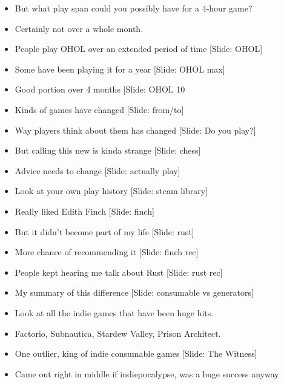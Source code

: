 \documentclass[12pt]{article}
\begin{document}
{\begin{itemize}
\item But what play span could you possibly have for a 4-hour game?

\item Certainly not over a whole month.

\item People play OHOL over an extended period of time [Slide: OHOL]

\item Some have been playing it for a year [Slide: OHOL max]

\item Good portion over 4 months [Slide: OHOL 10%

\item Kinds of games have changed [Slide: from/to]

\item Way players think about them has changed [Slide:  Do you play?]

\item But calling this new is kinda strange [Slide:  chess]

\item Advice needs to change [Slide: actually play]

\item Look at your own play history [Slide: steam library]

\item Really liked Edith Finch [Slide: finch]

\item But it didn't become part of my life [Slide: rust]

\item More chance of recommending it [Slide:  finch rec]

\item People kept hearing me talk about Rust [Slide:  rust rec]

\item My summary of this difference [Slide: consumable vs generators]

\item Look at all the indie games that have been huge hits.

\item Factorio, Subnautica, Stardew Valley, Prison Architect.

\item One outlier, king of indie consumable games [Slide:  The Witness]

\item Came out right in middle if indiepocalypse, was a huge success anyway


\end{itemize}}
\end{document}
